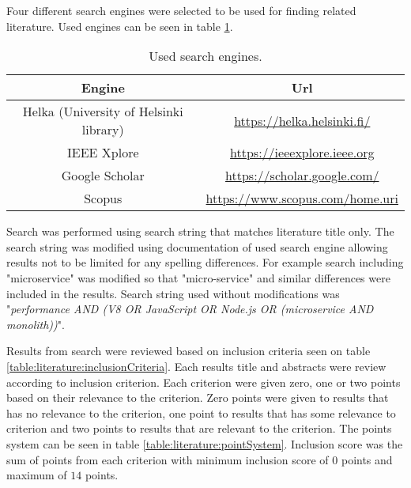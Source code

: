 Four different search engines were selected to be used for finding related literature.
Used engines can be seen in table \ref{table:literature:searchEngines}.
\begin{table}[ht!]
    \begin{tabular}{| c | c |} 
        \hline
        Engine
        & Url
        \\ [0.5ex]
        \hline\hline
        
        Helka (University of Helsinki library)
        & \url{https://helka.helsinki.fi/}
        \\
        
        IEEE Xplore
        & \url{https://ieeexplore.ieee.org}
        \\
        
        Google Scholar
        & \url{https://scholar.google.com/}
        \\

        Scopus
        & \url{https://www.scopus.com/home.uri}
        \\
        \hline
    \end{tabular}    
    \caption{Used search engines.}
    \label{table:literature:searchEngines}
\end{table}
Search was performed using search string that matches literature title only.
The search string was modified using documentation of used search engine allowing results not to be limited for any spelling differences.
For example search including "microservice" was modified so that "micro-service" and similar differences were included in the results.
Search string used without modifications was "\textit{performance AND (V8 OR JavaScript OR Node.js OR (microservice AND monolith))}".

Results from search were reviewed based on inclusion criteria seen on table \ref{table:literature:inclusionCriteria}.
Each results title and abstracts were review according to inclusion criterion.
Each criterion were given zero, one or two points based on their relevance to the criterion.
Zero points were given to results that has no relevance to the criterion, one point to results that has some relevance to criterion and two points to results that are relevant to the criterion.
The points system can be seen in table \ref{table:literature:pointSystem}.
Inclusion score was the sum of points from each criterion with minimum inclusion score of $0$ points and maximum of $14$ points.

